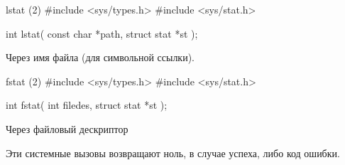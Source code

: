 \begin{CCode}{lstat (2)}
	#include <sys/types.h>
	#include <sys/stat.h>
	
	int lstat(
		const char *path, 
		struct stat *st
	); \end{CCode}
Через имя файла (для символьной ссылки).
	
\begin{CCode}{fstat (2)}
	#include <sys/types.h>
	#include <sys/stat.h>
	
	int fstat(
		int filedes, 
		struct stat *st
	); \end{CCode}
Через файловый дескриптор

Эти системные вызовы возвращают ноль, в случае успеха, либо код ошибки.